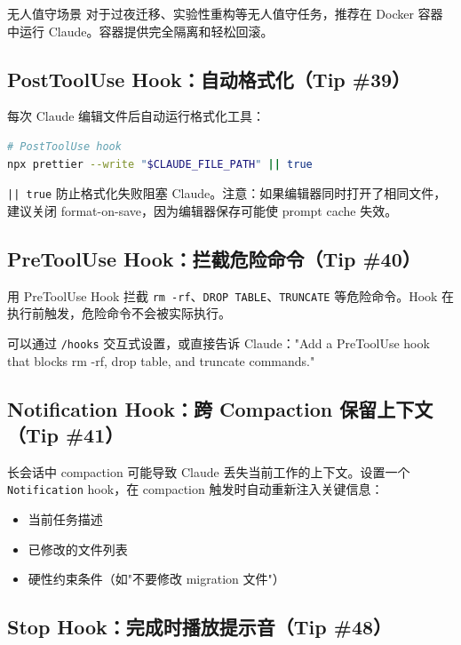 \documentclass[a4paper]{article}
\begin{document}
\begin{knowledgebox}{无人值守场景}
对于过夜迁移、实验性重构等无人值守任务，推荐在 Docker 容器中运行 Claude。容器提供完全隔离和轻松回滚。
\end{knowledgebox}

\subsection{PostToolUse Hook：自动格式化（Tip \#39）}

每次 Claude 编辑文件后自动运行格式化工具：

\begin{lstlisting}[caption={PostToolUse Hook 配置（.claude/settings.json）}, language=bash]
# PostToolUse hook
npx prettier --write "$CLAUDE_FILE_PATH" || true
\end{lstlisting}

\texttt{|| true} 防止格式化失败阻塞 Claude。注意：如果编辑器同时打开了相同文件，建议关闭 format-on-save，因为编辑器保存可能使 prompt cache 失效。

\subsection{PreToolUse Hook：拦截危险命令（Tip \#40）}

用 PreToolUse Hook 拦截 \texttt{rm -rf}、\texttt{DROP TABLE}、\texttt{TRUNCATE} 等危险命令。Hook 在执行前触发，危险命令不会被实际执行。

可以通过 \texttt{/hooks} 交互式设置，或直接告诉 Claude："Add a PreToolUse hook that blocks rm -rf, drop table, and truncate commands."

\subsection{Notification Hook：跨 Compaction 保留上下文（Tip \#41）}

长会话中 compaction 可能导致 Claude 丢失当前工作的上下文。设置一个 \texttt{Notification} hook，在 compaction 触发时自动重新注入关键信息：

\begin{itemize}
  \item 当前任务描述
  \item 已修改的文件列表
  \item 硬性约束条件（如"不要修改 migration 文件"）
\end{itemize}

\subsection{Stop Hook：完成时播放提示音（Tip \#48）}
\end{document}
